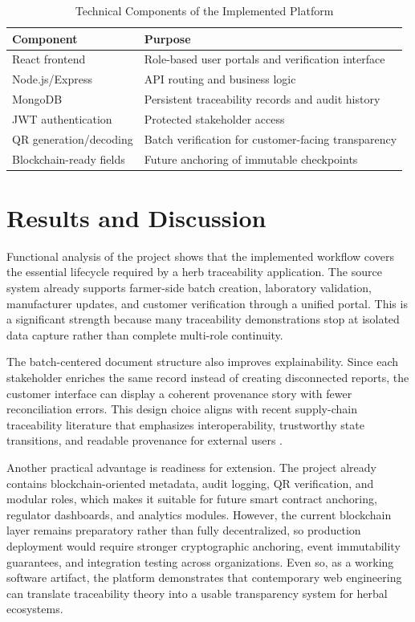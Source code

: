 \documentclass[conference]{IEEEtran}
\begin{document}
\begin{table}[!t]
\caption{Technical Components of the Implemented Platform}
\label{tab:stack}
\centering
\scriptsize
\begin{tabular}{p{2.0cm} p{5.1cm}}
\toprule
Component & Purpose \\
\midrule
React frontend & Role-based user portals and verification interface \\
Node.js/Express & API routing and business logic \\
MongoDB & Persistent traceability records and audit history \\
JWT authentication & Protected stakeholder access \\
QR generation/decoding & Batch verification for customer-facing transparency \\
Blockchain-ready fields & Future anchoring of immutable checkpoints \\
\bottomrule
\end{tabular}
\end{table}

\section{Results and Discussion}

Functional analysis of the project shows that the implemented workflow covers the essential lifecycle required by a herb traceability application. The source system already supports farmer-side batch creation, laboratory validation, manufacturer updates, and customer verification through a unified portal. This is a significant strength because many traceability demonstrations stop at isolated data capture rather than complete multi-role continuity.

The batch-centered document structure also improves explainability. Since each stakeholder enriches the same record instead of creating disconnected reports, the customer interface can display a coherent provenance story with fewer reconciliation errors. This design choice aligns with recent supply-chain traceability literature that emphasizes interoperability, trustworthy state transitions, and readable provenance for external users \cite{azevedo2023,gottschald2024,li2024}.

Another practical advantage is readiness for extension. The project already contains blockchain-oriented metadata, audit logging, QR verification, and modular roles, which makes it suitable for future smart contract anchoring, regulator dashboards, and analytics modules. However, the current blockchain layer remains preparatory rather than fully decentralized, so production deployment would require stronger cryptographic anchoring, event immutability guarantees, and integration testing across organizations. Even so, as a working software artifact, the platform demonstrates that contemporary web engineering can translate traceability theory into a usable transparency system for herbal ecosystems.
\end{document}

